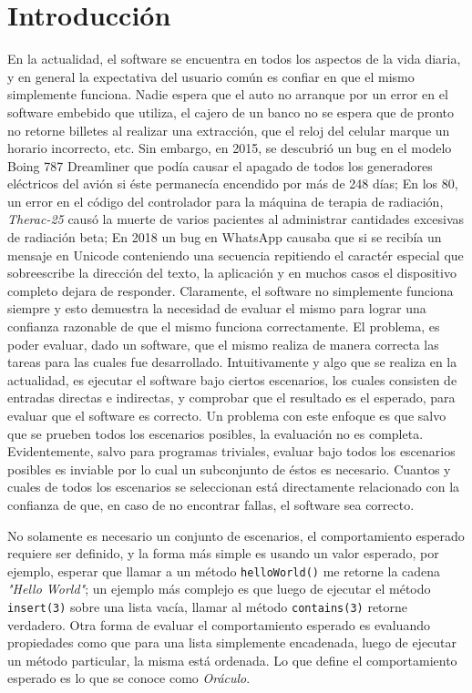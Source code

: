 \chapter{Introducci\'on}
\label{cap:introduccion}
En la actualidad, el software se encuentra en todos los aspectos de la vida diaria, y en general la expectativa del usuario com\'un es confiar en que el mismo simplemente funciona. Nadie espera que el auto no arranque por un error en el software embebido que utiliza, el cajero de un banco no se espera que de pronto no retorne billetes al realizar una extracci\'on, que el reloj del celular marque un horario incorrecto, etc. Sin embargo, en 2015, se descubri\'o un bug en el modelo Boing 787 Dreamliner que pod\'ia causar el apagado de todos los generadores el\'ectricos del avi\'on si \'este permanec\'ia encendido por m\'as de 248 d\'ias; En los 80, un error en el c\'odigo del controlador para la m\'aquina de terapia de radiaci\'on, \emph{Therac-25} caus\'o la muerte de varios pacientes al administrar cantidades excesivas de radiaci\'on beta; En 2018 un bug en WhatsApp causaba que si se recib\'ia un mensaje en Unicode conteniendo una secuencia repitiendo el caract\'er especial que sobreescribe la direcci\'on del texto, la aplicaci\'on y en muchos casos el dispositivo completo dejara de responder.
Claramente, el software no simplemente funciona siempre y esto demuestra la necesidad de evaluar el mismo para lograr una confianza razonable de que el mismo funciona correctamente. El problema, es poder evaluar, dado un software, que el mismo realiza de manera correcta las tareas para las cuales fue desarrollado. Intuitivamente y algo que se realiza en la actualidad, es ejecutar el software bajo ciertos escenarios, los cuales consisten de entradas directas e indirectas, y comprobar que el resultado es el esperado, para evaluar que el software es correcto. Un problema con este enfoque es que salvo que se prueben todos los escenarios posibles, la evaluaci\'on no es completa. Evidentemente, salvo para programas triviales, evaluar bajo todos los escenarios posibles es inviable por lo cual un subconjunto de \'estos es necesario. Cuantos y cuales de todos los escenarios se seleccionan est\'a directamente relacionado con la confianza de que, en caso de no encontrar fallas, el software sea correcto.

No solamente es necesario un conjunto de escenarios, el comportamiento esperado requiere ser definido, y la forma m\'as simple es usando un valor esperado, por ejemplo, esperar que llamar a un m\'etodo \texttt{helloWorld()} me retorne la cadena \emph{"Hello World"}; un ejemplo m\'as complejo es que luego de ejecutar el m\'etodo \texttt{insert(3)} sobre una lista vac\'ia, llamar al m\'etodo \texttt{contains(3)} retorne verdadero. Otra forma de evaluar el comportamiento esperado es evaluando propiedades como que para una lista simplemente encadenada, luego de ejecutar un m\'etodo particular, la misma est\'a ordenada. Lo que define el comportamiento esperado es lo que se conoce como \emph{Or\'aculo}.

